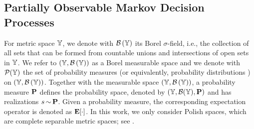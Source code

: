 \documentclass{ifacconf}
\newcommand{\new}[1]{{\color{blue}#1}}
\begin{document}
%
%
%
%    
%   
%    
%    
   


\subsection{Partially Observable Markov  Decision Processes}
For metric space ${\mathbb{Y}}$, we denote with  $\mathcal{B}\left({\mathbb{Y}}\right)$ its Borel $\sigma$-field, i.e., the  
collection of all sets that can be formed from countable unions and intersections of open sets in ${\mathbb{Y}}$.
We refer to  $({\mathbb{Y}},\mathcal{B}\left({\mathbb{Y}}\right))$ as a Borel measurable space and we denote with $\mathcal P({\mathbb{Y}})$ the set of probability measures \new{(or equivalently, probability distributions )} on $({\mathbb{Y}},\mathcal{B}\left({\mathbb{Y}}\right))$.
Together with the measurable space $({\mathbb{Y}},\mathcal{B}\left({\mathbb{Y}}\right))$,  a probability measure $\mathbf{P}$ defines the probability space, denoted by $({\mathbb{Y}},\mathcal{B}({\mathbb{Y}}),\mathbf{P})$ and has realizations  $s{\,\sim\,}\mathbf{P}$.     Given a probability measure, the corresponding expectation operator is denoted as  $\mathbf{E}[\cdot]$.
In this work,  we only consider Polish spaces, which are complete separable metric spaces; see \citep{bogachev2007measure}. 
\end{document}
